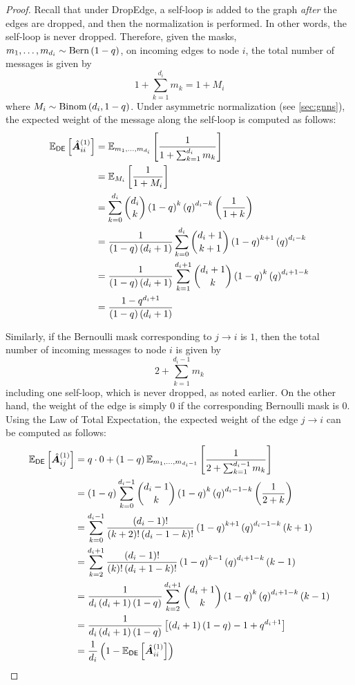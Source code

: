 \begin{proof}
    Recall that under DropEdge, a self-loop is added to the graph \textit{after} the edges are dropped, and then the normalization is performed. In other words, the self-loop is never dropped. 
    Therefore, given the \iid masks, $m_1, \ldots, m_{d_i} \sim \text{Bern}\left(1-q\right)$, on incoming edges to node $i$, the total number of messages is given by 
    $$
        1+\sum_{k=1}^{d_i} m_{k} = 1+M_i
    $$
    where $M_i \sim \text{Binom}\left(d_i, 1-q\right)$. Under asymmetric normalization (see \autoref{sec:gnns}), the expected weight of the message along the self-loop is computed as follows:
    \begin{align}
        \mathbb{E}_{\mathsf{DE}} \left[\hat{\bm{A}}^{\left(1\right)}_{ii}\right] 
        &= \mathbb{E}_{m_1,\ldots,m_{d_i}} \left[\frac{1}{1+\sum_{k=1}^{d_i} m_{k}}\right] \\
        &= \mathbb{E}_{M_i}\left[\frac{1}{1+M_i}\right] \\
        &= \sum_{k=0}^{d_i} \binom{d_i}{k} \left(1-q\right)^k \left(q\right)^{d_i-k} \left(\frac{1}{1+k}\right) \\
        &= \frac{1}{\left(1-q\right)\left(d_i+1\right)} \sum_{k=0}^{d_i} \binom{d_i+1}{k+1} \left(1-q\right)^{k+1} \left(q\right)^{d_i-k} \\
        &= \frac{1}{\left(1-q\right)\left(d_i+1\right)} \sum_{k=1}^{d_i+1} \binom{d_i+1}{k} \left(1-q\right)^{k} \left(q\right)^{d_i+1-k} \\
        &= \frac{1-q^{d_i+1}}{\left(1-q\right)\left(d_i+1\right)}
    \end{align}
    
    Similarly, if the Bernoulli mask corresponding to $j\to i$ is $1$, then the total number of incoming messages to node $i$ is given by 
    $$
        2+\sum_{k=1}^{d_i-1} m_k
    $$
    including one self-loop, which is never dropped, as noted earlier. On the other hand, the weight of the edge is simply $0$ if the corresponding Bernoulli mask is $0$. Using the Law of Total Expectation, the expected weight of the edge $j\to i$ can be computed as follows:
    \begin{align}
        \mathbb{E}_{\mathsf{DE}} \left[\hat{\bm{A}}^{\left(1\right)}_{ij}\right] 
        &= q\cdot 0 + \left(1-q\right) \mathbb{E}_{m_1,\ldots,m_{d_i-1}} \left[\frac{1}{2+\sum_{k=1}^{d_i-1} m_{k}}\right] \\
        &= \left(1-q\right) \sum_{k=0}^{d_i-1} \binom{d_i-1}{k} \left(1-q\right)^k \left(q\right)^{d_i-1-k} \left(\frac{1}{2+k}\right) \\
        &= \sum_{k=0}^{d_i-1} \frac{\left(d_i-1\right)!}{\left(k+2\right)!\left(d_i-1-k\right)!} \left(1-q\right)^{k+1} \left(q\right)^{d_i-1-k} \left(k+1\right) \\
        &= \sum_{k=2}^{d_i+1} \frac{\left(d_i-1\right)!}{\left(k\right)!\left(d_i+1-k\right)!} \left(1-q\right)^{k-1} \left(q\right)^{d_i+1-k} \left(k-1\right) \\
        &= \frac{1}{d_i\left(d_i+1\right)\left(1-q\right)} \sum_{k=2}^{d_i+1} \binom{d_i+1}{k} \left(1-q\right)^{k} \left(q\right)^{d_i+1-k} \left(k-1\right) \\
        &= \frac{1}{d_i\left(d_i+1\right)\left(1-q\right)} \left[\left(d_i+1\right)\left(1-q\right) - 1 + q^{d_i+1}\right] \\
        &= \frac{1}{d_i} \left(1-\mathbb{E}_{\mathsf{DE}} \left[\hat{\bm{A}}^{\left(1\right)}_{ii}\right]\right) 
    \end{align}
\end{proof}

